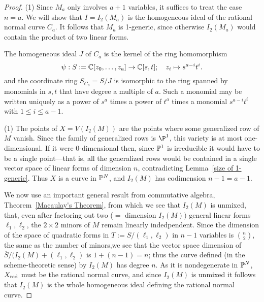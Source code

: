 \begin{proof} (1) Since $M_{a}$ only involves $a+1$ variables, it suffices to treat the case $n=a$. We will show that  $I = I_{2}(M_{a})$ is  the homogeneous ideal of the rational normal curve $C_{a}$. It follows that $M_{a}$ is 1-generic, since otherwise $I_{2}(M_{a})$ would contain the product of two linear forms.

The homogeneous ideal $J$ of $C_{a}$ is the kernel of the ring homomorphism
$$
\psi: S:= \CC[z_0,\dots,z_a] \to \CC[s,t]; \quad z_i \mapsto s^{a-i}t^i.
$$
 and
the coordinate ring $S_{C_{a}} = S/J$ is isomorphic to the ring spanned by
monomials in $s,t$ that have degree a multiple of $a$. Such
a monomial may be written uniquely as a power of
$s^a$
times a power of $t^a$ times a monomial $s^{a-i}t^i$ with $1\leq i\leq a-1$.

(1) The points of  $X = V(I_{2}(M))$ are the points where some generalized
row of $M$ vanish. Since the family of generalized rows is $\P^{1}$, this variety is
at most one-dimensional. If it were 0-dimensional then, since $\PP^{1}$ is irreducible
it would have to be a single point---that is, all the generalized rows would be contained
in a single vector space of linear forms of dimension $n$, contradicting Lemma~\ref{size of 1-generic}.
Thus $X$ is a curve in $\PP^{N}$, and $I_{2}(M)$ has codimension $n-1 = a-1$.

We now use an important general result from commutative algebra, Theorem~\ref{Macaulay's Theorem}, from which we see that $I_{2}(M)$ is unmixed, that, even after factoring out two ($=$ dimension $I_{2}(M))$ general linear forms $\ell_{1}, \ell_{2}$, the $2\times 2$ minors of $M$ remain linearly indedpendent.   Since the dimension of the space of quadratic forms in 
$T := S/(\ell_{1}, \ell_{2})$ in $n-1$ variables is ${n\choose 2}$,  the same as the number of minors,we see that the vector space dimension of $\overline S/(I_{2}(M)+(\ell_{1}, \ell_{2})$
is $1+(n-1) = n$; thus the curve defined (in the scheme-theoretic sense) by $I_{2}(M)$ 
has degree $n$. As it is nondegenerate in $\PP^{N}$, $X_{\rm red}$ must be the rational normal curve, and since $I_{2}(M)$ is unmixed it follows that $I_{2}(M)$ is the whole homogeneous ideal
defining the rational normal curve.


\end{proof}
